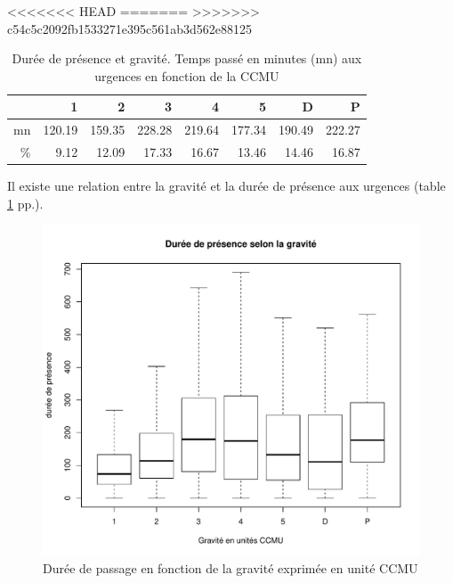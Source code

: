 \documentclass[12pt,english,french,twoside]{book}\usepackage[]{graphicx}\usepackage[]{color}
\makeatletter
\def\maxwidth{ %
  \ifdim\Gin@nat@width>\linewidth
    \linewidth
  \else
    \Gin@nat@width
  \fi
}
\newenvironment{knitrout}{}{} %
\makeatother
\begin{document}
<<<<<<< HEAD
=======
>>>>>>> c54c5c2092fb1533271e395c561ab3d562e88125
\begin{table}[ht]
\centering
\begin{tabular}{rrrrrrrr}
  \hline
 & 1 & 2 & 3 & 4 & 5 & D & P \\ 
  \hline
mn & 120.19 & 159.35 & 228.28 & 219.64 & 177.34 & 190.49 & 222.27 \\ 
  \% & 9.12 & 12.09 & 17.33 & 16.67 & 13.46 & 14.46 & 16.87 \\ 
   \hline
\end{tabular}
\caption[Durée de présence et gravité]{Durée de présence et gravité. Temps passé en minutes (mn) aux urgences en fonction de la CCMU} 
\label{duree_gravite}
\end{table}


Il existe une relation entre la gravité et la durée de présence aux urgences (table \ref{duree_gravite} pp.\pageref{duree_gravite}).

\begin{figure}[ht!]
 \centering
\begin{knitrout}
\color{fgcolor}
\includegraphics[width=\maxwidth]{figure/duree_gravite2} 

\end{knitrout}

 \caption{Durée de passage en fonction de la gravité exprimée en unité CCMU}
 \label{toucan}
\end{figure}
\end{document}
